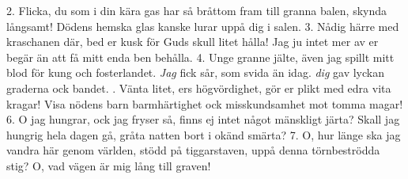 \setlength{\columnsep}{0.2cm}
\begin{multicols}{2}
2.  Flicka, du som i din kära gas
    har så bråttom fram till granna balen,
    skynda långsamt! Dödens hemska glas
    kanske lurar uppå dig i salen.
3.  Nådig härre med kraschanen där,
    bed er kusk för Guds skull litet hålla!
    Jag ju intet mer av er begär
    än att få mitt enda ben behålla.
4.  Unge granne jälte, även jag
    spillt mitt blod för kung och fosterlandet.
    \textit{Jag} fick sår, som svida än idag.
    \textit{dig} gav lyckan graderna ock bandet.
\vfill{}.  Vänta litet, ers högvördighet,
    gör er plikt med edra vita kragar!
    Visa nödens barn barmhärtighet
    ock misskundsamhet mot tomma magar!
6.  O jag hungrar, ock jag fryser så,
    finns ej intet något mänskligt järta?
    Skall jag hungrig hela dagen gå,
    gråta natten bort i okänd smärta?
7.  O, hur länge ska jag vandra här
    genom världen, stödd på tiggarstaven,
    uppå denna törnbeströdda stig?
    O, vad vägen är mig lång till graven!
\end{multicols}
